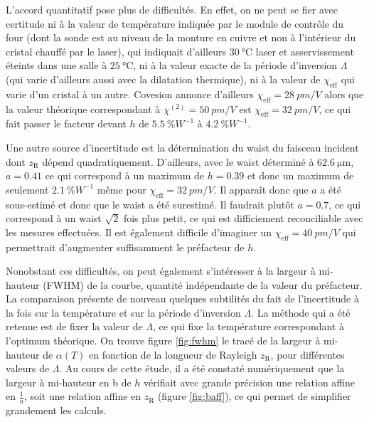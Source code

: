 \documentclass[11pt,a4paper] { article}
\newcommand{\zr}{z_\mathsc{R}}
\newcommand{\chie}{\chi_\mathsc{eff}}
\newcommand{\alphae}[1]{\SI{#1}{\percent W^{-1}}}
\newcommand{\mathsc}[1]{\mathrm{\scriptscriptstyle {#1}}}
\begin{document}
L'accord quantitatif pose plus de difficultés. En effet, on ne peut se fier avec certitude ni à la valeur de température indiquée par le module de contrôle du four (dont la sonde est au niveau de la monture en cuivre et non à l'intérieur du cristal chauffé par le laser), qui indiquait d'ailleurs $\SI{30}{\celsius}$ laser et asservissement éteints dans une salle à $\SI{25}{\celsius}$, ni à la valeur exacte de la période d'inversion $\Lambda$ (qui varie d'ailleurs aussi avec la dilatation thermique), ni à la valeur de $\chie$ qui varie d'un cristal à un autre. Covesion annonce d'ailleurs $\chie = \SI{28}{pm/V}$ alors que la valeur théorique correspondant à $\chi^{(2)}=\SI{50}{pm/V}$ est $\chie = \SI{32}{pm/V}$, ce qui fait passer le facteur devant $h$ de $\SI{5.5}{\percent W^{-1}}$ à $\SI{4.2}{\percent W^{-1}}$.

Une autre source d'incertitude est la détermination du waist du faisceau incident dont $\zr$ dépend quadratiquement. D'ailleurs, avec le waist déterminé à $\SI{62.6}{\micro\meter}$, $a=0.41$ ce qui correspond à un maximum de $h = 0.39$ et donc un maximum de seulement $\alphae{2.1}$ même pour $\chie = \SI{32}{pm/V}$. Il apparaît donc que $a$ a été sous-estimé et donc que le waist a été surestimé. Il faudrait plutôt $a=0.7$, ce qui correspond à un waist $\sqrt2$ fois plus petit, ce qui est difficiement reconciliable avec les mesures effectuées. %
Il est également difficile d'imaginer un $\chie=\SI{40}{pm/V}$ qui permettrait d'augmenter suffisamment le préfacteur de $h$.

Nonobstant ces difficultés, on peut également s'intéresser à la largeur à mi-hauteur (FWHM) de la courbe, quantité indépendante de la valeur du préfacteur.
La comparaison présente de nouveau quelques subtilités du fait de l'incertitude à la fois sur la température et sur la période d'inversion $\Lambda$. La méthode qui a été retenue est de fixer la valeur de $\Lambda$, ce qui fixe la température correspondant à l'optimum théorique.
On trouve figure \ref{fig:fwhm} le tracé de la largeur à mi-hauteur de $\alpha(T)$ en fonction de la longueur de Rayleigh $\zr$, pour différentes valeurs de $\Lambda$. Au cours de cette étude, il a été constaté numériquement que la largeur à mi-hauteur en b de $h$ vérifiait avec grande précision une relation affine en $\frac1a$, soit une relation affine en $\zr$ (figure \ref{fig:baff}), ce qui permet de simplifier grandement les calculs.
\end{document}
